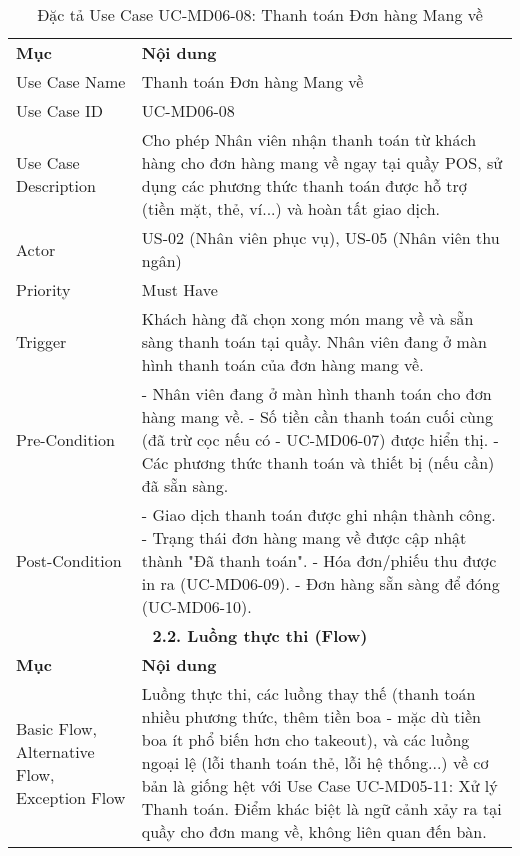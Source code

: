 \begin{longtable}{|m{4cm}|p{11cm}|}
\caption{Đặc tả Use Case UC-MD06-08: Thanh toán Đơn hàng Mang về} \label{tab:uc_md06_08} \\
\hline

\endhead %
\hline
\endfoot %
\hline
\endlastfoot %
\multicolumn{2}{|c|}{\textbf{2.1. Tóm tắt (Summary)}} \\
\hline
\textbf{Mục} & \textbf{Nội dung} \\
\hline
Use Case Name & Thanh toán Đơn hàng Mang về \\
\hline
Use Case ID & UC-MD06-08 \\
\hline
Use Case Description & Cho phép Nhân viên nhận thanh toán từ khách hàng cho đơn hàng mang về ngay tại quầy POS, sử dụng các phương thức thanh toán được hỗ trợ (tiền mặt, thẻ, ví...) và hoàn tất giao dịch. \\
\hline
Actor & US-02 (Nhân viên phục vụ), US-05 (Nhân viên thu ngân) \\
\hline
Priority & Must Have \\
\hline
Trigger & Khách hàng đã chọn xong món mang về và sẵn sàng thanh toán tại quầy. Nhân viên đang ở màn hình thanh toán của đơn hàng mang về. \\
\hline
Pre-Condition & - Nhân viên đang ở màn hình thanh toán cho đơn hàng mang về. \newline - Số tiền cần thanh toán cuối cùng (đã trừ cọc nếu có - UC-MD06-07) được hiển thị. \newline - Các phương thức thanh toán và thiết bị (nếu cần) đã sẵn sàng. \\
\hline
Post-Condition & - Giao dịch thanh toán được ghi nhận thành công. \newline - Trạng thái đơn hàng mang về được cập nhật thành "Đã thanh toán". \newline - Hóa đơn/phiếu thu được in ra (UC-MD06-09). \newline - Đơn hàng sẵn sàng để đóng (UC-MD06-10). \\
\hline
\multicolumn{2}{|c|}{\textbf{2.2. Luồng thực thi (Flow)}} \\
\hline
\textbf{Mục} & \textbf{Nội dung} \\
\hline
Basic Flow, Alternative Flow, Exception Flow & Luồng thực thi, các luồng thay thế (thanh toán nhiều phương thức, thêm tiền boa - mặc dù tiền boa ít phổ biến hơn cho takeout), và các luồng ngoại lệ (lỗi thanh toán thẻ, lỗi hệ thống...) về cơ bản là giống hệt với Use Case UC-MD05-11: Xử lý Thanh toán. Điểm khác biệt là ngữ cảnh xảy ra tại quầy cho đơn mang về, không liên quan đến bàn. \\

\end{longtable}
